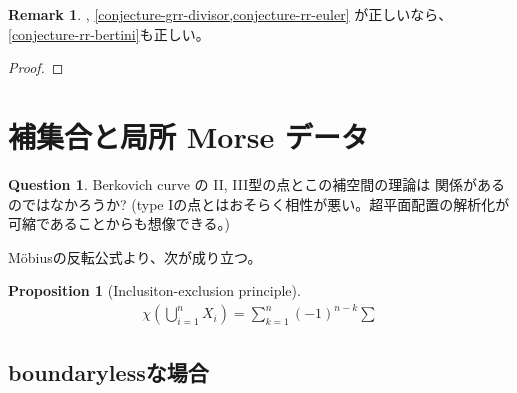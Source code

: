 \documentclass[a4paper,dvipdfmx,reqno,12pt]{amsart}
\theoremstyle{definition}
\newtheorem{proposition}[theorem]{Proposition}
\newtheorem{question}[theorem]{Question}
\newtheorem{remark}[theorem]{Remark}
\numberwithin{equation}{section}
\begin{document}
\begin{remark}
\cite[Conjecture 6.13]{demedrano2023chern},
\cref{conjecture-grr-divisor,conjecture-rr-euler}
が正しいなら、\cref{conjecture-rr-bertini}も正しい。  
\end{remark}

\begin{proof}





\end{proof}



\section{補集合と局所 Morse データ}

\begin{question}
Berkovich curve の II, III型の点とこの補空間の理論は
関係があるのではなかろうか? 
(type Iの点とはおそらく相性が悪い。超平面配置の解析化が
可縮であることからも想像できる。)
\end{question}

M\"obiusの反転公式より、次が成り立つ。

\begin{proposition}[{Inclusiton-exclusion principle}]

\begin{align}
\chi(\bigcup_{i=1}^{n} X_i)=
\sum_{k=1}^{n}(-1)^{n-k}\sum 
\end{align}


\subsection{boundarylessな場合}


\end{proposition}












\end{document}
